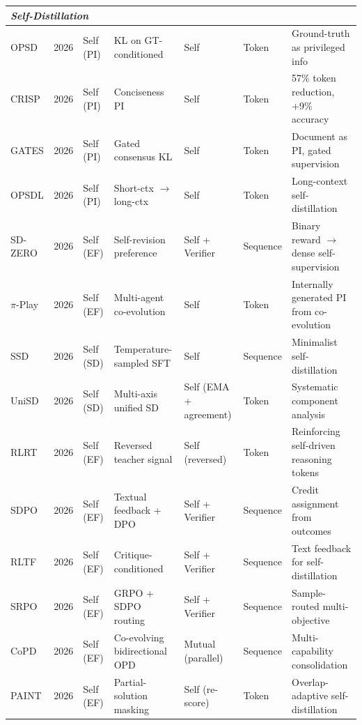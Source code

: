 \documentclass{article} %
\begin{document}
\begin{table}[t]
{\begin{tabular}{@{}lclllll@{}}
        \midrule
        \multicolumn{7}{l}{\textit{Self-Distillation}} \\
        \midrule
        OPSD \citep{2601.18734} & 2026 & Self (PI) & KL on GT-conditioned & Self & Token & Ground-truth as privileged info \\
        CRISP \citep{2603.05433} & 2026 & Self (PI) & Conciseness PI & Self & Token & 57\% token reduction, +9\% accuracy \\
        GATES \citep{2602.20574} & 2026 & Self (PI) & Gated consensus KL & Self & Token & Document as PI, gated supervision \\
        OPSDL \citep{2604.17535} & 2026 & Self (PI) & Short-ctx $\to$ long-ctx & Self & Token & Long-context self-distillation \\
        SD-ZERO \citep{he2026selfdistillation} & 2026 & Self (EF) & Self-revision preference & Self + Verifier & Sequence & Binary reward $\to$ dense self-supervision \\
        $\pi$-Play \citep{zhang2026piplay} & 2026 & Self (EF) & Multi-agent co-evolution & Self & Token & Internally generated PI from co-evolution \\
        SSD \citep{zhang2026embarrassingly} & 2026 & Self (SD) & Temperature-sampled SFT & Self & Sequence & Minimalist self-distillation \\
        UniSD \citep{jin2026unisd} & 2026 & Self (SD) & Multi-axis unified SD & Self (EMA + agreement) & Token & Systematic component analysis \\
        RLRT \citep{kim2026rlrt} & 2026 & Self (EF) & Reversed teacher signal & Self (reversed) & Token & Reinforcing self-driven reasoning tokens \\
        SDPO \citep{2601.20802} & 2026 & Self (EF) & Textual feedback + DPO & Self + Verifier & Sequence & Credit assignment from outcomes \\
        RLTF \citep{song2026expanding} & 2026 & Self (EF) & Critique-conditioned & Self + Verifier & Sequence & Text feedback for self-distillation \\
        SRPO \citep{li2026unifying} & 2026 & Self (EF) & GRPO + SDPO routing & Self + Verifier & Sequence & Sample-routed multi-objective \\
        CoPD \citep{gu2026copd} & 2026 & Self (EF) & Co-evolving bidirectional OPD & Mutual (parallel) & Sequence & Multi-capability consolidation \\
        PAINT \citep{wang2026paint} & 2026 & Self (EF) & Partial-solution masking & Self (re-score) & Token & Overlap-adaptive self-distillation \\

\end{tabular}}
\end{table}
\end{document}
